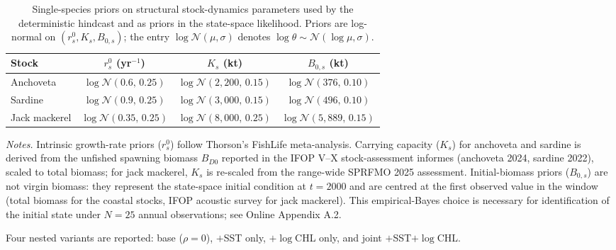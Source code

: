 \documentclass[
  11pt,
]{article}
\begin{document}
\begin{table}[H]
\centering\small
\renewcommand{\arraystretch}{1.0}
\caption{Single-species priors on structural stock-dynamics parameters used by the deterministic hindcast and as priors in the state-space likelihood. Priors are log-normal on $(r_s^{0}, K_s, B_{0,s})$; the entry $\log\mathcal{N}(\mu,\sigma)$ denotes $\log\theta \sim \mathcal{N}(\log\mu,\sigma)$.\label{tab:stress-structural-priors}}
\begin{threeparttable}
\begin{tabular}{lccc}
\toprule
Stock & $r_s^{0}$ (yr$^{-1}$) & $K_s$ (kt) & $B_{0,s}$ (kt) \\
\midrule
Anchoveta              & $\log\mathcal{N}(0.6,\,0.25)$   & $\log\mathcal{N}(2{,}200,\,0.15)$ & $\log\mathcal{N}(376,\,0.10)$   \\
Sardine         & $\log\mathcal{N}(0.9,\,0.25)$   & $\log\mathcal{N}(3{,}000,\,0.15)$ & $\log\mathcal{N}(496,\,0.10)$   \\
Jack mackerel          & $\log\mathcal{N}(0.35,\,0.25)$  & $\log\mathcal{N}(8{,}000,\,0.25)$ & $\log\mathcal{N}(5{,}889,\,0.15)$ \\
\bottomrule
\end{tabular}
\begin{tablenotes}\footnotesize
\item \emph{Notes.} Intrinsic growth-rate priors ($r_s^{0}$) follow Thorson's FishLife meta-analysis. Carrying capacity ($K_s$) for anchoveta and sardine is derived from the unfished spawning biomass $B_{D0}$ reported in the IFOP V--X stock-assessment informes (anchoveta 2024, sardine 2022), scaled to total biomass; for jack mackerel, $K_s$ is re-scaled from the range-wide SPRFMO 2025 assessment. Initial-biomass priors ($B_{0,s}$) are not virgin biomass: they represent the state-space initial condition at $t=2000$ and are centred at the first observed value in the window (total biomass for the coastal stocks, IFOP acoustic survey for jack mackerel). This empirical-Bayes choice is necessary for identification of the initial state under $N=25$ annual observations; see Online Appendix A.2.
\end{tablenotes}
\end{threeparttable}
\end{table}

Four nested variants are reported: base (\(\rho=0\)), \(+\)SST
only, \(+\log\)CHL only, and joint \(+\)SST\(+\log\)CHL.
\label{eq:stress-law}
\label{eq:stress-shifter}
\label{sec:appendix-stress-results}
\end{document}
